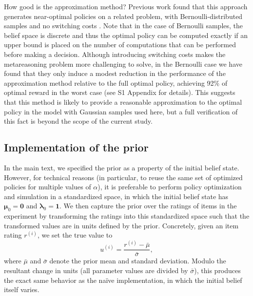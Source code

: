How good is the approximation method? Previous work found that this approach generates near-optimal policies on a related problem, with Bernoulli-distributed samples and no switching costs \citep{callaway2018learning}. Note that in the case of Bernoulli samples, the belief space is discrete and thus the optimal policy can be computed exactly if an upper bound is placed on the number of computations that can be performed before making a decision. Although introducing switching costs makes the metareasoning problem more challenging to solve, in the Bernoulli case we have found that they only induce a modest reduction in the performance of the approximation method relative to the full optimal policy, achieving 92\% of optimal reward in the worst case (see S1 Appendix for details). This suggests that this method is likely to provide a reasonable approximation to the optimal policy in the model with Gaussian samples used here, but a full verification of this fact is beyond the scope of the current study.





\subsection{Implementation of the prior}

In the main text, we specified the prior as a property of the initial belief state. However, for technical reasons (in particular, to reuse the same set of optimized policies for multiple values of $\alpha$), it is preferable to perform policy optimization and simulation in a standardized space, in which the initial belief state has $\boldsymbol{\mu}_0 = \mathbf{0}$ and $\boldsymbol{\lambda}_0 = \mathbf{1}$. We then capture the prior over the ratings of items in the experiment by transforming the ratings into this standardized space such that the transformed values are in units defined by the prior. Concretely, given an item rating $r^{(i)}$, we set the true value to
\begin{equation}\label{eq:rating-value}
  u^{(i)} = \frac{r^{(i)} - \bar{\mu}}{\bar{\sigma}},
\end{equation}
where $\bar{\mu}$ and $\bar{\sigma}$ denote the prior mean and standard deviation. 
Modulo the resultant change in units (all parameter values are divided by $\bar{\sigma}$), this produces the exact same behavior as the na\"ive implementation, in which the initial belief itself varies. 

